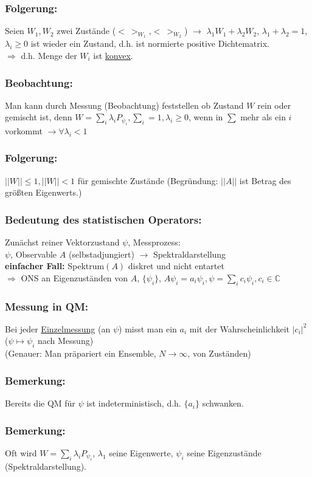 \documentclass[twoside,a4paper]{scrartcl}
\newcommand{\C}{\mathbb{C}}
\renewcommand{\1}{\mathds{1}}
\newcommand{\Ra}{\Rightarrow}
\newcommand{\ra}{\rightarrow}
\renewcommand{\l}{\lambda}
\renewcommand{\C}{\mathbb{C}}
\begin{document}
\subsubsection*{Folgerung:}
Seien $W_1,W_2$ zwei Zustände ($< \ >_{W_1}$,$< \ >_{W_2}$) $\ra$ $\l_1 W_1+\l_2 W_2$, $\l_1+\l_2=1$, $\l_i\geq 0$ ist wieder ein Zustand, d.h. ist normierte positive Dichtematrix.\\
$\Ra$ d.h. Menge der $W_i$ ist \underline{konvex}.
\subsubsection*{Beobachtung:}
Man kann durch Messung (Beobachtung) feststellen ob Zustand $W$ rein oder gemischt ist, denn $W=\sum_i \l_i P_{\psi_i}, \sum_i=1, \l_i\geq 0$, wenn in $\sum$ mehr als ein $i$ vorkommt $\ra \forall \l_i <1$ 
\subsubsection*{Folgerung:}
$||W||\leq 1, ||W||<1$ für gemischte Zustände (Begründung: $||A||$ ist Betrag des größten Eigenwerts.)
\subsubsection*{Bedeutung des statistischen Operators:}
Zunächst reiner Vektorzustand $\psi$, Messprozess:\\
$\psi$, Observable $A$ (selbstadjungiert) $\ra$ Spektraldarstellung\\
\textbf{einfacher Fall:} Spektrum$(A)$ diskret und nicht entartet\\
$\Ra$ ONS an Eigenzuständen von $A$, $\{\psi_i\}$, $A\psi_i=a_i\psi_i, \psi=\sum_i c_i \psi_i,c_i\in \C$
\subsubsection*{Messung in QM:}
Bei jeder \underline{Einzelmessung} (an $\psi$) misst man ein $a_i$ mit der Wahrscheinlichkeit $|c_i|^2$ ($\psi \mapsto \psi_i$ nach Messung)\\
(Genauer: Man präpariert ein Ensemble, $N \ra \infty$, von Zuständen)
\subsubsection*{Bemerkung:}
Bereits die QM für $\psi$ ist indeterministisch, d.h. $\{a_i\}$ schwanken.
\subsubsection*{Bemerkung:}
Oft wird $W=\sum_i \l_i P_{\psi_i}$, $\l_1$ seine Eigenwerte, $\psi_i$ seine Eigenzustände (Spektraldarstellung).
\end{document}
